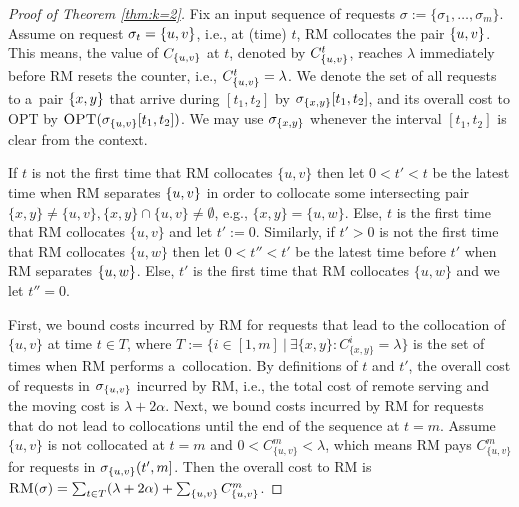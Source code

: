 \documentclass[a4paper,anonymous,USenglish]{lipics-v2019}
\newcommand{\OPT}{\textsc{OPT}\xspace}
\newcommand{\RM}{\textsc{RM}\xspace} %
\DeclarePairedDelimiter\set{\{}{\}}
\begin{document}
\begin{proof}[Proof of Theorem \ref{thm:k=2}]
	Fix an input sequence of requests
$\sigma:=\{\sigma_1,\dots, \sigma_m\}$.
	Assume on request $\sigma_{t}=\set{u,v}$, 
	i.e., at (time) $t$,
	\RM collocates the pair $\set{u,v}$.
	This means,
	the value of $C_{\set{u,v}}$ at $t$,
	denoted by $C^t_{\set{u,v}}$, 
	reaches $\lambda$ immediately before \RM resets the counter,
	i.e.,
	$ C^t_{\set{u,v}} = \lambda$.
	We denote the set of all requests to a~pair $\set{x,y}$ that arrive
	during $[t_1,t_2]$ by $\sigma_{\set{x,y}}[t_1,t_2]$,
	and its overall cost to \OPT by
	$\OPT (\sigma_{\{u,v\}}[t_1,t_2])$.
	We may use $\sigma_{\set{x,y}}$ whenever
	 the interval $[t_1,t_2]$ is clear from the context.
	
	If $t$ is not the first time that \RM collocates $\{u,v\}$ then
	let $0 < t' < t$ be the latest time when \RM separates $\set{u,v}$
	in order to collocate some intersecting pair
	$\{x,y\} \neq \{u,v\}, \{x,y\} \cap \{u,v\} \neq \emptyset$, 
	e.g.,
	$\{x,y\}=\{u,w\}$.
	Else,
	$t$ is the first time that \RM collocates $\{u,v\}$ and let $t' := 0$.
	Similarly,
	if $t' > 0$ is not the first time that \RM  collocates $\{u,w\}$ 
	then let $0 < t'' < t'$ be the latest time before $t'$ when \RM separates $\set{u,w}$.
	Else,
	$t'$ is the first time that \RM collocates $\{u,w\}$ and we let $t''=0$.
	
	First,
	we bound  costs incurred by \RM for requests that
	lead to the collocation of $\{u,v\}$ at time $t \in T$, where
	$T := \{ i \in [1,m] ~\vert~ \exists \{x,y\}: C^{i}_{\{x,y\}} = \lambda \}$
	is the set of times when \RM performs a~collocation.
	By definitions of $t$ and $t'$,
	the overall cost of requests in $\sigma_{\set{u,v}}$ incurred by \RM,
	i.e., the total cost of remote serving 	and the moving cost is
	$\lambda + 2\alpha$.	
	Next,
	we bound costs incurred by \RM
	for requests that do not lead to collocations until the  end of the sequence at $t=m$.
	Assume $\{u,v\}$ is not collocated at $t=m$
	and $0 < C^{m}_{ \{u,v\} } < \lambda $,
	which means \RM pays $C^{m}_{ \{u,v\} }$
	for  requests in $\sigma_{\set{u,v}}(t',m]$.
    Then the overall cost to \RM is
$	\RM (\sigma)
=
\sum_{ t \in T}(\lambda + 2\alpha) +
\sum_{\{u,v\}} C^{m}_{\{u,v\}}	
$.
	

\end{proof}
\end{document}
